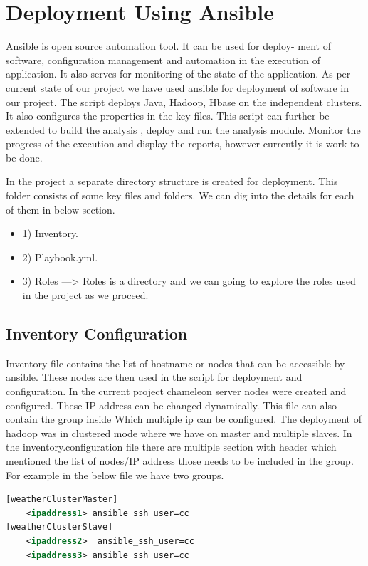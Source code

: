 \documentclass[9pt,twocolumn,twoside]{../../styles/osajnl}
\begin{document}
\section{Deployment Using Ansible}

Ansible is open source automation tool. It can be used for deploy- ment of software, configuration management and automation in the execution of application. 
It also serves for monitoring of the state of the application. As per current state of our project we have used ansible for deployment of software in our project. 
The script deploys Java, Hadoop, Hbase on the independent clusters. It also configures the properties in the key files. This script can further be extended to
build the analysis , deploy and run the analysis module. Monitor the progress of the execution and display the reports, however currently it is work to be done. 

In the project a separate directory structure is created for deployment.
This folder consists of some key files and folders. We can dig into the details for each of them in below section.

\begin{itemize}
\item 1) Inventory.
\item 2) Playbook.yml.
\item 3) Roles —> Roles is a directory and we can going to explore the roles used in the project as we proceed.
\end{itemize}

\subsection{Inventory Configuration}


Inventory file contains the list of hostname or nodes that can be accessible by ansible. These nodes are then used in the script for deployment and configuration. 
In the current project chameleon server nodes were created and configured.
These IP address can be changed dynamically. This file can also contain the group inside Which multiple ip can be configured. The deployment of hadoop was in 
clustered mode where we have on master and multiple slaves. In the inventory.configuration file there are multiple section with header which mentioned the list
of nodes/IP address those needs to be included in the group. For example in the below file we have two groups.

\begin{lstlisting}[language=xml,caption=Inventory,breaklines=true]
[weatherClusterMaster]
	<ipaddress1> ansible_ssh_user=cc
[weatherClusterSlave]
	<ipaddress2>  ansible_ssh_user=cc
	<ipaddress3> ansible_ssh_user=cc
\end{lstlisting}
\end{document}
